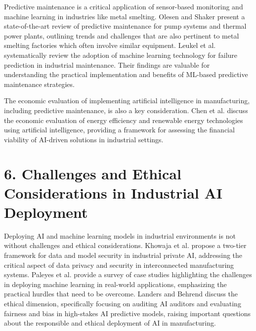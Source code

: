 Predictive maintenance is a critical application of sensor-based monitoring and machine learning in industries like metal smelting. Olesen and Shaker \cite{olesen-2020} present a state-of-the-art review of predictive maintenance for pump systems and thermal power plants, outlining trends and challenges that are also pertinent to metal smelting factories which often involve similar equipment. Leukel et al. \cite{leukel-2021} systematically review the adoption of machine learning technology for failure prediction in industrial maintenance. Their findings are valuable for understanding the practical implementation and benefits of ML-based predictive maintenance strategies.

The economic evaluation of implementing artificial intelligence in manufacturing, including predictive maintenance, is also a key consideration. Chen et al. \cite{chen-2021} discuss the economic evaluation of energy efficiency and renewable energy technologies using artificial intelligence, providing a framework for assessing the financial viability of AI-driven solutions in industrial settings.

\section*{6. Challenges and Ethical Considerations in Industrial AI Deployment}

Deploying AI and machine learning models in industrial environments is not without challenges and ethical considerations. Khowaja et al. \cite{khowaja-2022} propose a two-tier framework for data and model security in industrial private AI, addressing the critical aspect of data privacy and security in interconnected manufacturing systems. Paleyes et al. \cite{paleyes-2022} provide a survey of case studies highlighting the challenges in deploying machine learning in real-world applications, emphasizing the practical hurdles that need to be overcome. Landers and Behrend \cite{landers-2022} discuss the ethical dimension, specifically focusing on auditing AI auditors and evaluating fairness and bias in high-stakes AI predictive models, raising important questions about the responsible and ethical deployment of AI in manufacturing.